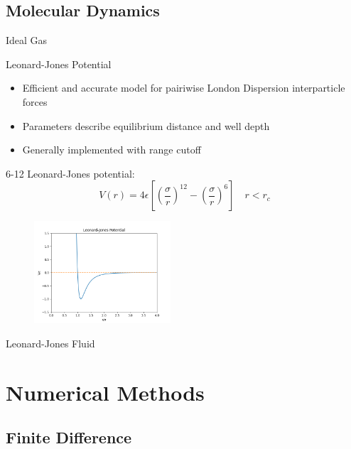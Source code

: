 \documentclass{beamer}
\theoremstyle{remark}
\begin{document}
\subsection{Molecular Dynamics}

\begin{frame}{Ideal Gas}


	
\end{frame}

\begin{frame}{Leonard-Jones Potential}


	\begin{itemize}
		\item Efficient and accurate model for pairiwise London Dispersion interparticle forces
		\item Parameters describe equilibrium distance and well depth
		\item Generally implemented with range cutoff
	\end{itemize}

	6-12 Leonard-Jones potential:
	\begin{equation}
		V(r)=4\epsilon\left[ \left( \frac{\sigma}{r} \right)^{12}-\left( \frac{\sigma}{r} \right)^6 \right]\quad r<r_c
	\end{equation}

	\begin{figure}
		\center
		\includegraphics[width = 2in]{media/lj_pot.png}

	\end{figure}
	
\end{frame}

\begin{frame}{Leonard-Jones Fluid}
	
\end{frame}

\section{Numerical Methods}

\subsection{Finite Difference}
\end{document}
